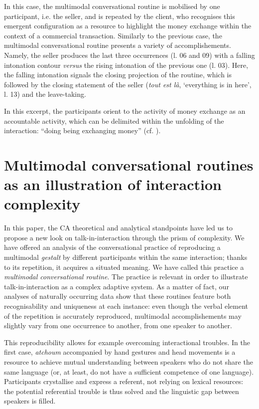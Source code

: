 \documentclass[output=paper]{langscibook}
\begin{document}
In this case, the multimodal conversational routine is mobilised by one participant, i.e. the seller, and is repeated by the client, who recognises this emergent configuration as a resource to highlight the money exchange within the context of a commercial transaction. Similarly to the previous case, the multimodal conversational routine presents a variety of accomplishements. Namely, the seller produces the last three occurrences (l. 06 and 09) with a falling intonation contour \textit{versus} the rising intonation of the previous one (l. 03). Here, the falling intonation signals the closing projection of the routine, which is followed by the closing statement of the seller (\textit{tout est là}, `everything is in here', l. 13) and the leave-taking.

In this excerpt, the participants orient to the activity of money exchange as an accountable activity, which can be delimited within the unfolding of the interaction: “doing being exchanging money” (cf. \citealt{Sacks1984}).

\section{Multimodal conversational routines as an illustration of interaction complexity}\largerpage

In this paper, the CA theoretical and analytical standpoints have led us to propose a new look on talk-in-interaction through the prism of complexity. We have offered an analysis of the conversational practice of reproducing a multimodal \textit{gestalt} by different participants within the same interaction; thanks to its repetition, it acquires a situated meaning. We have called this practice a \textit{multimodal conversational routine}. The practice is relevant in order to illustrate talk-in-interaction as a complex adaptive system. As a matter of fact, our analyses of naturally occurring data show that these routines feature both recognisability and uniqueness at each instance: even though the verbal element of the repetition is accurately reproduced, multimodal accomplishements may slightly vary from one occurrence to another, from one speaker to another. 

This reproducibility allows for example overcoming interactional troubles. In the first case, \textit{atchoum} accompanied by hand gestures and head movements is a resource to achieve mutual understanding between speakers who do not share the same language (or, at least, do not have a sufficient competence of one language). Participants crystallise and express a referent, not relying on lexical resources: the potential referential trouble is thus solved and the linguistic gap between speakers is filled. 
\end{document}
